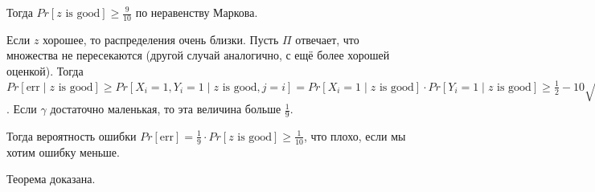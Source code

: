 Тогда $Pr[z \text{ is good}] \geq \frac{9}{10}$ по неравенству Маркова.

Если $z$ хорошее, то распределения очень близки. Пусть $\Pi$ отвечает, что множества не пересекаются (другой случай аналогично, с ещё более хорошей оценкой). Тогда $Pr[\text{err} \mid z \text{ is good}] \geq Pr[X_i = 1, Y_i = 1 \mid z \text{ is good}, j = i] = Pr[X_i = 1 \mid z \text{ is good}] \cdot Pr[Y_i = 1 \mid z \text{ is good}] \geq \frac{1}{2} - 10\sqrt{\frac{3}{4}\gamma}$. Если $\gamma$ достаточно маленькая, то эта величина больше $\frac{1}{9}$.

Тогда вероятность ошибки $Pr[\text{err}] = \frac{1}{9} \cdot Pr[z \text{ is good}] \geq \frac{1}{10}$, что плохо, если мы хотим ошибку меньше.

Теорема доказана.

